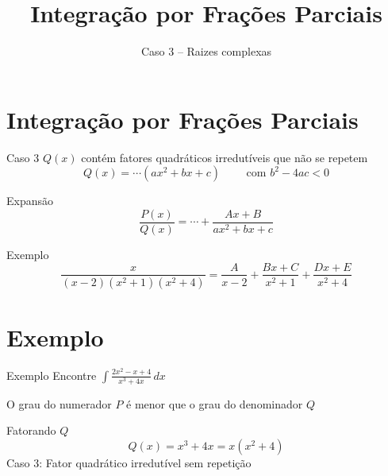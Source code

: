 
\usepackage{integracao_e_series}
\usepackage{systeme}

\title{Integração por Frações Parciais}
\subtitle{Caso 3 -- Raizes complexas}



\addtitle

\section{Integração por Frações Parciais}

\begin{frame}{Caso 3}
  $Q(x)$ contém fatores quadráticos irredutíveis que não se repetem
  \[
    Q(x) = \cdots  \left( ax^2 + bx + c \right)
    \qquad
    \text{ com } b^2-4ac<0
  \]

  \pause
  Expansão
  \[
    \frac{P(x)}{Q(x)}
    = \cdots
    + \frac{Ax+B}{ax^2 + bx + c}
  \]
\end{frame}

\begin{frame}{Exemplo}
  \[
    \frac{x}{(x-2)(x^2+1)(x^2+4)}
    = \frac{A}{x-2}
    + \frac{Bx+C}{x^2+1}
    + \frac{Dx+E}{x^2+4}
  \]
\end{frame}

\addtocounter{exemplo}{1}
\section{Exemplo \theexemplo}

\begin{frame}{Exemplo \theexemplo}
  Encontre \(\int \frac{2x^2-x+4}{x^3+4x}\,dx\)

  \pause
  O grau do numerador $P$ é menor que o grau do denominador $Q$

  \pause
  Fatorando $Q$
  \[
    Q(x)
    = x^3 + 4x
    = x\left( x^2 + 4 \right)
  \]
  \pause
  Caso 3: Fator quadrático irredutível sem repetição
\end{frame}

